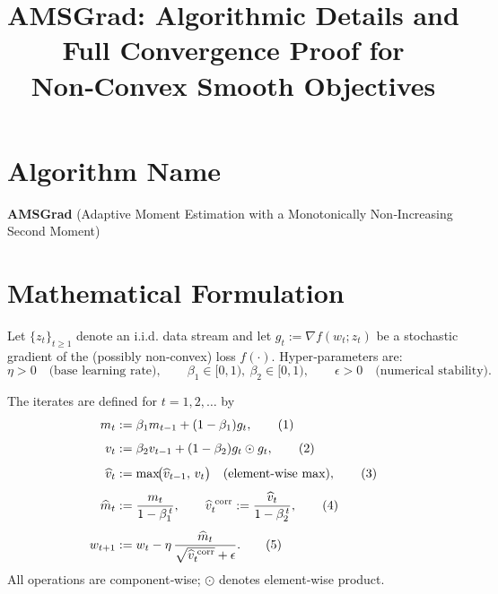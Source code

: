 \documentclass{article}
\begin{document}
\title{AMSGrad: Algorithmic Details and Full Convergence Proof for Non‑Convex Smooth Objectives}
\author{}
\date{}
\maketitle

\section*{Algorithm Name}
\textbf{AMSGrad} (Adaptive Moment Estimation with a Monotonically Non‑Increasing Second Moment)

\section*{Mathematical Formulation}
Let $\{z_t\}_{t\ge 1}$ denote an i.i.d. data stream and let  
$g_t:=\nabla f(w_t;z_t)$ be a stochastic gradient of the (possibly non‑convex) loss $f(\cdot)$.  
Hyper‑parameters are:
\[
\eta>0\quad\text{(base learning rate)},\qquad 
\beta_1\in[0,1),\ \beta_2\in[0,1),\qquad
\epsilon>0\quad\text{(numerical stability)} .
\]

The iterates are defined for $t=1,2,\dots$ by
\begin{subequations}\label{eq:amsgrad}
\begin{align}
m_t &:= \beta_1 m_{t-1} + (1-\beta_1) g_t, \tag{1}\\[4pt]
v_t &:= \beta_2 v_{t-1} + (1-\beta_2) g_t\odot g_t, \tag{2}\\[4pt]
\widehat v_t &:= \max\!\bigl(\widehat v_{t-1},\,v_t\bigr) \quad\text{(element‑wise max)},\tag{3}\\[4pt]
\widehat m_t &:= \frac{m_t}{1-\beta_1^{\,t}},\qquad
\widehat v_t^{\;{\rm corr}}:=\frac{\widehat v_t}{1-\beta_2^{\,t}},\tag{4}\\[4pt]
w_{t+1} &:= w_t - \eta\,
\frac{\widehat m_t}{\sqrt{\widehat v_t^{\;{\rm corr}}}+\epsilon}. \tag{5}
\end{align}
\end{subequations}
All operations are component‑wise; $\odot$ denotes element‑wise product.

\end{document}
